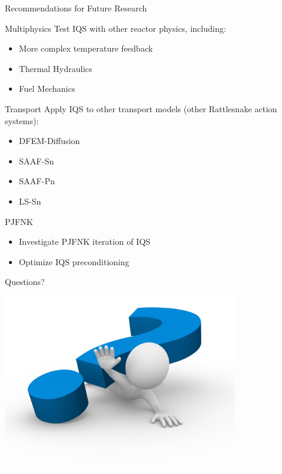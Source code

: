 \documentclass[8pt,xcolor=dvipnames]{beamer}
\begin{document}
\begin{frame}{Recommendations for Future Research}

\begin{block}{Multiphysics}
Test IQS with other reactor physics, including:
\begin{itemize}
\item More complex temperature feedback
\item Thermal Hydraulics
\item Fuel Mechanics
\end{itemize}
\end{block}

\begin{block}{Transport}
Apply IQS to other transport models (other Rattlesnake action systems):
\begin{itemize}
\item DFEM-Diffusion
\item SAAF-Sn
\item SAAF-Pn
\item LS-Sn
\end{itemize}
\end{block}

\begin{block}{PJFNK}
\begin{itemize}
\item Investigate PJFNK iteration of IQS
\item Optimize IQS preconditioning
\end{itemize}
\end{block}

\end{frame}

\begin{frame}{Questions?}

\centering
\includegraphics[width=\linewidth,height=3in,keepaspectratio]{figures/question_mark.jpg}

\end{frame}
\end{document}
